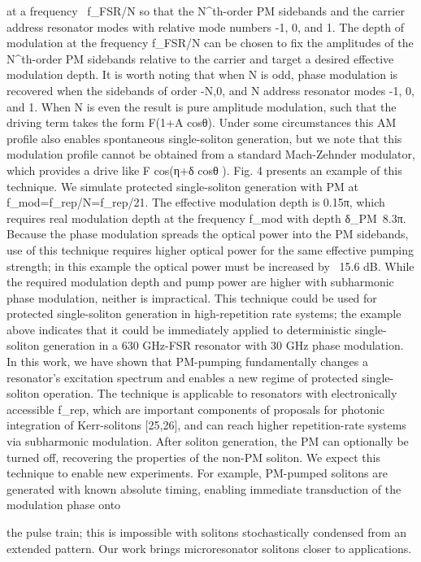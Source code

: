 at a frequency ~f_FSR/N so that the N^th-order PM sidebands and the carrier address resonator modes with relative mode numbers -1, 0, and 1. The depth of modulation at the frequency f_FSR/N can be chosen to fix the amplitudes of the N^th-order PM sidebands relative to the carrier and target a desired effective modulation depth. It is worth noting that when N is odd, phase modulation is recovered when the sidebands of order -N,0, and N address resonator modes -1, 0, and 1. When N is even the result is pure amplitude modulation, such that the driving term takes the form F(1+A cos⁡θ). Under some circumstances this AM profile also enables spontaneous single-soliton generation, but we note that this modulation profile cannot be obtained from a standard Mach-Zehnder modulator, which provides a drive like F cos⁡(η+δ cos⁡θ ).
Fig. 4 presents an example of this technique. We simulate protected single-soliton generation with PM at f_mod=f_rep/N=f_rep/21. The effective modulation depth is 0.15π, which requires real modulation depth at the frequency f_mod with depth δ_PM~8.3π.  Because the phase modulation spreads the optical power into the PM sidebands, use of this technique requires higher optical power for the same effective pumping strength; in this example the optical power must be increased by ~15.6 dB. While the required modulation depth and pump power are higher with subharmonic phase modulation, neither is impractical. This technique could be used for protected single-soliton generation in high-repetition rate systems; the example above indicates that it could be immediately applied to deterministic single-soliton generation in a 630 GHz-FSR resonator with 30 GHz phase modulation. 
In this work, we have shown that PM-pumping fundamentally changes a resonator’s excitation spectrum and enables a new regime of protected single-soliton operation. The technique is applicable to resonators with electronically accessible f_rep, which are important components of proposals for photonic integration of Kerr-solitons  [25,26], and can reach higher repetition-rate systems via subharmonic modulation. After soliton generation, the PM can optionally be turned off, recovering the properties of the non-PM soliton. We expect this technique to enable new experiments. For example, PM-pumped solitons are generated with known absolute timing, enabling immediate transduction of the modulation phase onto




the pulse train; this is impossible with solitons stochastically condensed from an extended pattern. Our work brings microresonator solitons closer to applications.

